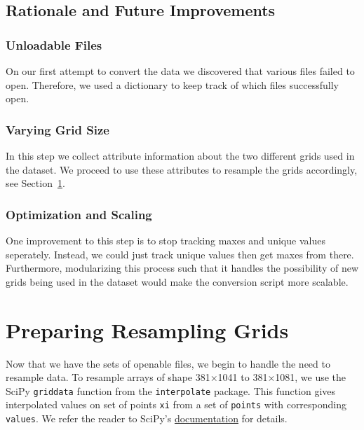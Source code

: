 \documentclass[
  letterpaper,
  DIV=11,
  numbers=noendperiod]{scrreprt}
\begin{document}
\subsection{Rationale and Future
Improvements}\label{rationale-and-future-improvements-1}

\subsubsection{Unloadable Files}\label{unloadable-files}

On our first attempt to convert the data we discovered that various
files failed to open. Therefore, we used a dictionary to keep track of
which files successfully open.

\subsubsection{Varying Grid Size}\label{varying-grid-size}

In this step we collect attribute information about the two different
grids used in the dataset. We proceed to use these attributes to
resample the grids accordingly, see Section~\ref{sec-resampling}.

\subsubsection{Optimization and Scaling}\label{optimization-and-scaling}

One improvement to this step is to stop tracking maxes and unique values
seperately. Instead, we could just track unique values then get maxes
from there. Furthermore, modularizing this process such that it handles
the possibility of new grids being used in the dataset would make the
conversion script more scalable.

\section{Preparing Resampling Grids}\label{sec-resampling}

Now that we have the sets of openable files, we begin to handle the need
to resample data. To resample arrays of shape 381×1041 to 381×1081, we
use the SciPy \texttt{griddata} function from the \texttt{interpolate}
package. This function gives interpolated values on set of points
\texttt{xi} from a set of \texttt{points} with corresponding
\texttt{values}. We refer the reader to SciPy's
\href{https://docs.scipy.org/doc/scipy/reference/generated/scipy.interpolate.griddata.html}{documentation}
for details.
\end{document}
